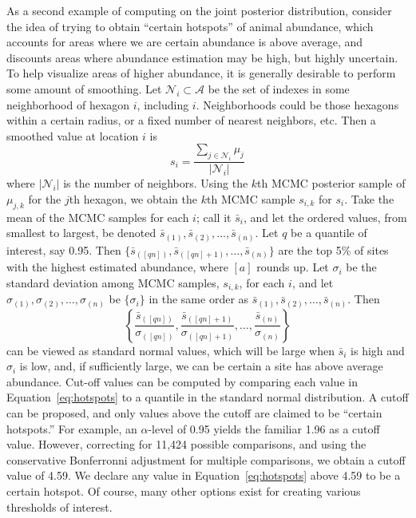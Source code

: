 \documentclass[11pt, titlepage]{article}
\begin{document}
\begin{spacing}{1.9}
\begin{flushleft}
As a second example of computing on the joint posterior distribution, consider the idea of trying to obtain ``certain hotspots'' of animal abundance, which accounts for areas where we are certain abundance is above average, and discounts areas where abundance estimation may be high, but highly uncertain.  To help visualize areas of higher abundance, it is generally desirable to perform some amount of smoothing.  Let $\mathcal{N}_{i} \subset \mathcal{A}$ be the set of indexes in some neighborhood of hexagon $i$, including $i$. Neighborhoods could be those hexagons within a certain radius, or a fixed number of nearest neighbors, etc. Then a smoothed value at location $i$ is
\begin{equation} \label{eq:smoomui}
s_{i} = \frac{\sum_{j \in \mathcal{N}_{i}}\mu_{j}}{|\mathcal{N}_{i}|}
\end{equation}
where $|\mathcal{N}_{i}|$ is the number of neighbors.  Using the $k$th MCMC posterior sample of $\mu_{j,k}$ for the $j$th hexagon, we obtain the $k$th MCMC sample $s_{i,k}$ for $s_{i}$.  Take the mean of the MCMC samples for each $i$; call it $\bar{s}_i$, and let the ordered values, from smallest to largest, be denoted $\bar{s}_{(1)}, \bar{s}_{(2)}, \ldots, \bar{s}_{(n)}$.  Let $q$ be a quantile of interest, say 0.95. Then $\{\bar{s}_{([qn])}, \bar{s}_{([qn]+1)}, \ldots, \bar{s}_{(n)}\}$ are the top 5\% of sites with the highest estimated abundance, where $[a]$ rounds up. Let $\sigma_i$ be the standard deviation among MCMC samples, $s_{i,k}$, for each $i$, and let $\sigma_{(1)}, \sigma_{(2)}, \ldots, \sigma_{(n)}$ be $\{\sigma_i\}$ in the same order as $\bar{s}_{(1)}, \bar{s}_{(2)}, \ldots, \bar{s}_{(n)}$. Then 
\begin{equation} \label{eq:hotspots}
\left\{ \frac{\bar{s}_{([qn])}}{\sigma_{([qn])}}, \frac{\bar{s}_{([qn]+1)}}{\sigma_{([qn]+1)}}, \ldots, \frac{\bar{s}_{(n)}}{\sigma_{(n)}} \right\}
\end{equation}
can be viewed as standard normal values, which will be large when $\bar{s}_i$ is high and $\sigma_{i}$ is low, and, if sufficiently large, we can be certain a site has above average abundance. Cut-off values can be computed by comparing each value in Equation~\eqref{eq:hotspots} to a quantile in the standard normal distribution. A cutoff can be proposed, and only values above the cutoff are claimed to be ``certain hotspots.''  For example, an $\alpha$-level of 0.95 yields the familiar 1.96 as a cutoff value.  However, correcting for 11,424 possible comparisons, and using the conservative Bonferronni adjustment for multiple comparisons, we obtain a cutoff value of 4.59.  We declare any value in Equation~\eqref{eq:hotspots} above 4.59 to be a certain hotspot.  Of course, many other options exist for creating various thresholds of interest.


\end{flushleft}
\end{spacing}
\end{document}
